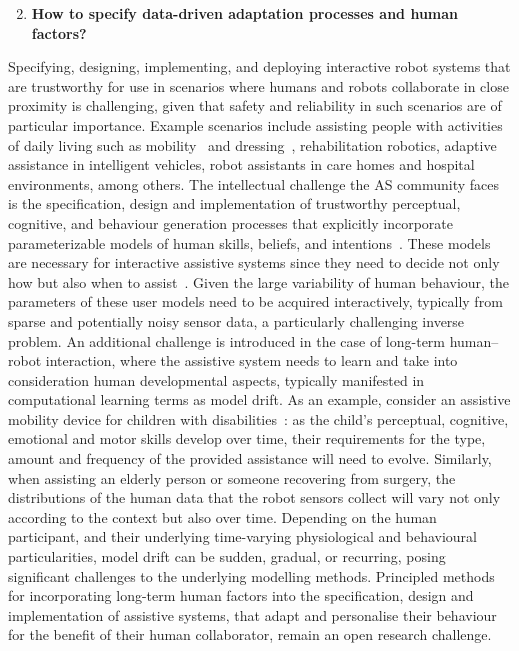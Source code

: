 \documentclass[sigconf,nonacm]{acmart}%
\begin{document}
	\begin{enumerate}[leftmargin=0.5cm]
		\setcounter{enumi}{1}
		\item \textbf{How to specify data-driven adaptation processes and human factors?}
	\end{enumerate}
	Specifying, designing, implementing, and deploying interactive robot systems that are trustworthy for use in scenarios where humans and robots collaborate in close proximity is challenging, given that safety and reliability in such scenarios are of particular importance. Example scenarios include assisting people with activities of daily living such as mobility~\cite{SohDemiris2015} and dressing~\cite{GaoEtAl2020}, rehabilitation robotics, adaptive assistance in intelligent vehicles, robot assistants in care homes and hospital environments, among others. The intellectual challenge the AS community faces is the specification, design and implementation of trustworthy perceptual, cognitive, and behaviour generation processes that explicitly incorporate parameterizable models of human skills, beliefs, and intentions~\cite{Demiris2007}. 
	These models are necessary for interactive assistive systems since they need to decide not only how but also when to assist~\cite{GeorgiouDemiris}. Given the large variability of human behaviour, the parameters of these user models need to be acquired interactively, typically from sparse and potentially noisy sensor data, a particularly challenging inverse problem. An additional challenge is introduced in the case of long-term human–robot interaction, where the assistive system needs to learn and take into consideration human developmental aspects, typically manifested in computational learning terms as model drift. 
	As an example, consider an assistive mobility device for children with disabilities~\cite{SohDemiris2015}: as the child's perceptual, cognitive, emotional and motor skills develop over time, their requirements for the type, amount and frequency of the provided assistance will need to evolve. Similarly, when assisting an elderly person or someone recovering from surgery, the distributions of the human data that the robot sensors collect will vary not only according to the context but also over time. 
	Depending on the human participant, and their underlying time-varying physiological and behavioural particularities, model drift can be sudden, gradual, or recurring, posing significant challenges to the underlying modelling methods. Principled methods for incorporating long-term human factors into the specification, design and implementation of assistive systems, that adapt and personalise their behaviour for the benefit of their human collaborator, remain an open research challenge. 
	
\end{document}
